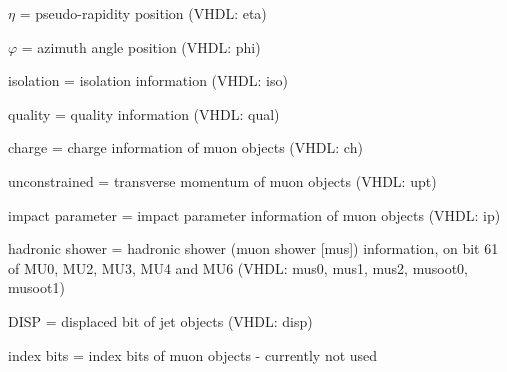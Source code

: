 \begin{description}
\item {$\eta$} = pseudo-rapidity position (VHDL: eta)
\item {$\varphi$} = azimuth angle position (VHDL: phi)
\item {isolation} = isolation information (VHDL: iso)
\item {quality} = quality information (VHDL: qual)
\item {charge} = charge information of muon objects (VHDL: ch)
\item {unconstrained \pt} = transverse momentum of muon objects (VHDL: upt)
\item {impact parameter} = impact parameter information of muon objects (VHDL: ip)
\item {hadronic shower} = hadronic shower (muon shower [mus]) information, on bit 61 of MU0, MU2, MU3, MU4 and MU6 (VHDL: mus0, mus1, mus2, musoot0, musoot1)
\item {DISP} = displaced bit of jet objects (VHDL: disp)
\item {index bits} = index bits of muon objects - currently not used
\end{description}

\clearpage
